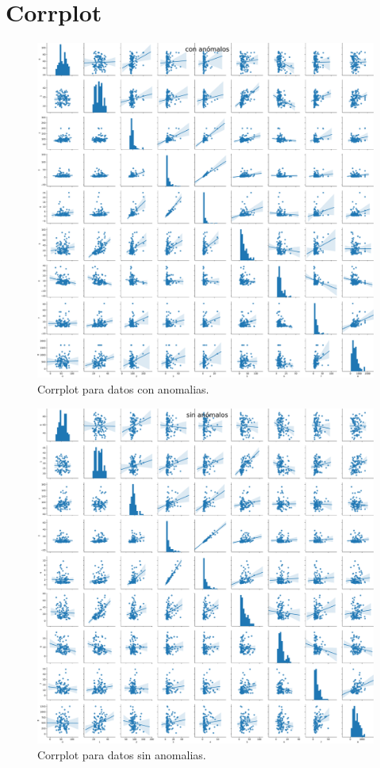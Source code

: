 \documentclass{article}
\begin{document}


\newpage
\section{Corrplot}

\begin{figure}[h]
\centering
\includegraphics[width = \linewidth]{../python/images/corrp.pdf}
\caption{Corrplot para datos con anomalias.}
\label{fig:cps}
\end{figure}



\begin{figure}[h]
\centering
\includegraphics[width = \linewidth]{../python/images/corrp1.pdf}
\caption{Corrplot para datos sin anomalias.}
\label{fig:cp1s}
\end{figure}
\end{document}
